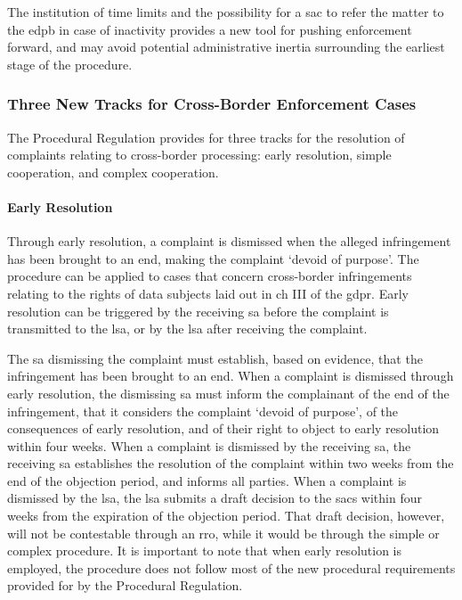 The institution of time limits and the possibility for a \gls{sac} to refer the matter to the \gls{edpb} in case of inactivity provides a new tool for pushing enforcement forward, and may avoid potential administrative inertia surrounding the earliest stage of the procedure.\autocite[503]{mustertProceduralisingEnforcement2026}

\subsubsection{Three New Tracks for Cross-Border Enforcement Cases}
\label{sec:ch3-three-new-tracks}

The Procedural Regulation provides for three tracks for the resolution of complaints relating to cross-border processing: early resolution, simple cooperation, and complex cooperation.

\paragraph{Early Resolution} 
Through early resolution, a complaint is dismissed when the alleged infringement has been brought to an end, making the complaint `devoid of purpose'.\autocite[5(2)]{ProceduralRegulation}
The procedure can be applied to cases that concern cross-border infringements relating to the rights of data subjects laid out in ch III of the \gls{gdpr}.\autocites[5(1)]{ProceduralRegulation}[ch III]{GDPR}
Early resolution can be triggered by the receiving \gls{sa} before the complaint is transmitted to the \gls{lsa}, or by the \gls{lsa} after receiving the complaint.\autocite[5(1)]{ProceduralRegulation}

The \gls{sa} dismissing the complaint must establish, based on evidence, that the infringement has been brought to an end.\autocite[5(2)]{ProceduralRegulation}
When a complaint is dismissed through early resolution, the dismissing \gls{sa} must inform the complainant of the end of the infringement, that it considers the complaint `devoid of purpose', of the consequences of early resolution, and of their right to object to early resolution within four weeks.\autocite[5(2)]{ProceduralRegulation}
When a complaint is dismissed by the receiving \gls{sa}, the receiving \gls{sa} establishes the resolution of the complaint within two weeks from the end of the objection period, and informs all parties.\autocite[5(3)]{ProceduralRegulation}
When a complaint is dismissed by the \gls{lsa}, the \gls{lsa} submits a draft decision to the \glspl{sac} within four weeks from the expiration of the objection period.\autocite[5(4)]{ProceduralRegulation}
That draft decision, however, will not be contestable through an \gls{rro}, while it would be through the simple or complex procedure.\autocite[23(1)(c)]{ProceduralRegulation}
It is important to note that when early resolution is employed, the procedure does not follow most of the new procedural requirements provided for by the Procedural Regulation.\autocite[5(6)]{ProceduralRegulation}

